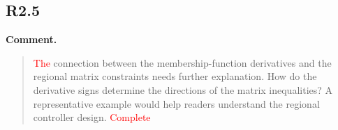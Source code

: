 \documentclass[12pt,a4paper]{article}
\begin{document}
%
%

\subsection*{R2.5}

\textbf{Comment.}
\begin{quote}
\raggedright
\textcolor{red}{The} connection between the membership-function derivatives and the regional matrix constraints needs further explanation. How do the derivative signs determine the directions of the matrix inequalities? A representative example would help readers understand the regional controller design. \textcolor{red}{Complete}
\end{quote}
\end{document}
